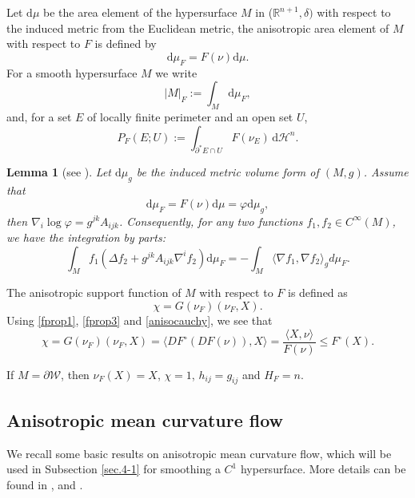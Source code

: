 \documentclass[10pt,a4paper]{amsart}
\newtheorem{lemma}[proposition]{Lemma}
\numberwithin{equation}{section}
\begin{document}
	Let $\mathrm{d}\mu$ be the area element of the hypersurface $M$ in ($\mathbb{R}^{n+1},\delta)$ with respect to the induced metric from the Euclidean metric, the anisotropic area element of $M$ with respect to $F$ is defined by
	\begin{equation*}
		\mathrm{d}\mu_F = F(\nu)\mathrm{d}\mu.
	\end{equation*}
	For a smooth hypersurface $M$ we write
	\begin{equation*}
		|M|_F:=\int_M\mathrm{d}\mu_F,
	\end{equation*}
	and, for a set $E$ of locally finite perimeter and an open set $U$,
	\begin{equation*}
		P_F(E;U):=\int_{\partial^*E\cap U}F(\nu_E)\,\mathrm{d}\mathcal H^n.
	\end{equation*}
	\begin{lemma}[see {\cite[Lemma 2.8]{Xia12}}]
		Let $\mathrm{d}\mu_{g}$ be the induced metric volume form of $(M,g)$. Assume that
		\begin{equation*}
			\mathrm{d}\mu_F = F(\nu)\mathrm{d}\mu = \varphi\mathrm{d}\mu_{g},
		\end{equation*}
		then $\nabla_{i} \log\varphi = g^{jk}A_{ijk}$.  Consequently, for any two functions $f_1, f_2\in C^{\infty}(M)$, we have the integration by parts:
		\begin{equation}\label{intebyparts}
			\int_{M} f_1\left(\Delta f_2+ g^{jk}A_{ijk}\nabla^i f_2\right) \mathrm{d}\mu_F = -\int_M\langle \nabla f_1,\nabla f_2\rangle_{g}d\mu_F.
		\end{equation}
	\end{lemma}
	
	The anisotropic support function of $M$ with respect to $F$ is defined as \begin{equation*}
		\chi=G(\nu_F)(\nu_F,X).
	\end{equation*}
	Using \eqref{fprop1}, \eqref{fprop3} and \eqref{anisocauchy}, we see that
	\begin{equation}
		\chi=G(\nu_F)(\nu_F,X)=\langle DF^{\circ}(DF(\nu)),X \rangle=\dfrac{\langle X,\nu \rangle}{F(\nu)}\leq F^{\circ}(X).
		\label{equ-uf0}
	\end{equation}
	
	If $M=\partial\mathcal{W}$, then $\nu_F(X)=X$, $\chi=1$, $h_{ij}=g_{ij}$ and $H_F=n$.
	
	\subsection{Anisotropic mean curvature flow}
	\label{appB}
	We recall some basic results on anisotropic mean curvature flow, which will be used in Subsection \ref{sec.4-1} for smoothing a $C^1$ hypersurface. More details can be found in   \cite{Andrews01}, \cite{WX21} and \cite{CL07}. 
\end{document}
